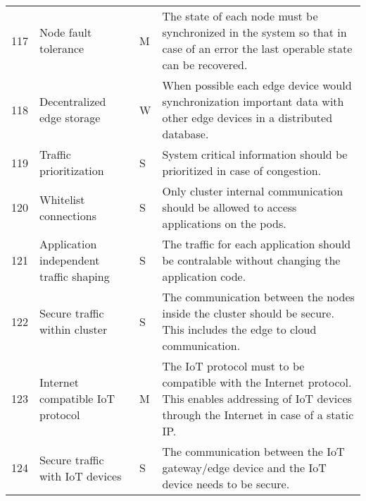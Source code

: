 \begin{longtable}{l p{3.5cm} p{0.8cm} p{12.5cm} }
117                     & Node fault tolerance                    & M      & The state of each node must be synchronized in the system so that in case of an error the last operable state can be recovered.                                                                                                     \\
118                     & Decentralized edge storage              & W      & When possible each edge device would synchronization important data with other edge devices in a distributed database.                                                                                                              \\
119                     & Traffic prioritization                  & S      & System critical information should be prioritized in case of congestion.                                                                                                                                                            \\
120                     & Whitelist connections                   & S      & Only cluster internal communication should be allowed to access applications on the pods.                                                                                                                                           \\
121                     & Application independent traffic shaping & S      & The traffic for each application should be contralable without changing the application code.                                                                                                                                       \\
122                     & Secure traffic within cluster           & S      & The communication between the nodes inside the cluster should be secure. This includes the edge to cloud communication.                                                                                                             \\
123                     & Internet compatible IoT protocol        & M      & The IoT protocol must to be compatible with the Internet protocol. This enables addressing of IoT devices through the Internet in case of a static IP.                                                                              \\
124                     & Secure traffic with IoT devices         & S      & The communication between the IoT gateway/edge device and the IoT device needs to be secure.                                                                                                                                        \\

\end{longtable}
